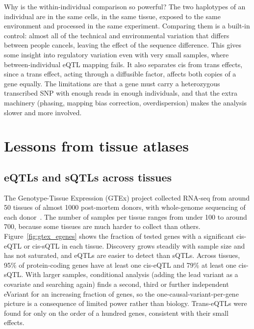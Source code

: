 Why is the within-individual comparison so powerful? The two haplotypes of an individual are in the same cells, in the same tissue, exposed to the same environment and processed in the same experiment. Comparing them is a built-in control: almost all of the technical and environmental variation that differs between people cancels, leaving the effect of the sequence difference. This gives some insight into regulatory variation even with very small samples, where between-individual eQTL mapping fails. It also separates cis from trans effects, since a trans effect, acting through a diffusible factor, affects both copies of a gene equally. The limitations are that a gene must carry a heterozygous transcribed SNP with enough reads in enough individuals, and that the extra machinery (phasing, mapping bias correction, overdispersion) makes the analysis slower and more involved.

\section{Lessons from tissue atlases}

\subsection{eQTLs and sQTLs across tissues}

The Genotype-Tissue Expression (GTEx) project collected RNA-seq from around 50 tissues of almost 1000 post-mortem donors, with whole-genome sequencing of each donor~\citep{gtex2017,gtex2020}. The number of samples per tissue ranges from under 100 to around 700, because some tissues are much harder to collect than others. Figure~\ref{fig:gtex_egenes} shows the fraction of tested genes with a significant cis-eQTL or cis-sQTL in each tissue. Discovery grows steadily with sample size and has not saturated, and eQTLs are easier to detect than sQTLs. Across tissues, 95\% of protein-coding genes have at least one cis-eQTL and 79\% at least one cis-sQTL. With larger samples, conditional analysis (adding the lead variant as a covariate and searching again) finds a second, third or further independent eVariant for an increasing fraction of genes, so the one-causal-variant-per-gene picture is a consequence of limited power rather than biology. Trans-eQTLs were found for only on the order of a hundred genes, consistent with their small effects.

